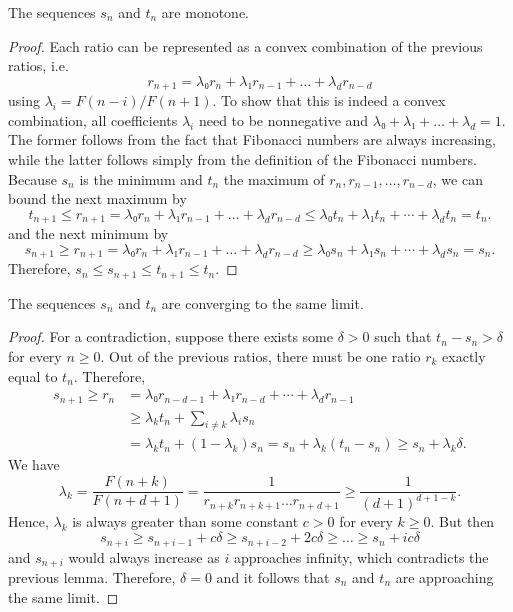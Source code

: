 \begin{lemma}
  The sequences $s_n$ and $t_n$ are monotone.
\end{lemma}

\begin{proof}
  Each ratio can be represented as a convex combination of the previous ratios, i.e.
  \[
    r_{n+1} = λ₀ r_n + λ₁ r_{n-1} + \dots + λ_d r_{n-d}
  \]
  using $λ_i = F(n - i) / F(n + 1)$.
  To show that this is indeed a convex combination, all coefficients $λ_i$
  need to be nonnegative and $λ₀ + λ₁ + \dots + \lambda_d = 1$.
  The former follows from the fact that Fibonacci numbers are always increasing,
  while the latter follows simply from the definition of the Fibonacci numbers.
  Because $s_n$ is the minimum and $t_n$ the maximum of $r_n, r_{n-1}, …, r_{n-d}$,
  we can bound the next maximum by
  \[
    t_{n+1} ≤ r_{n+1} = λ₀ r_n + λ₁ r_{n-1} + \dots + λ_d r_{n-d} ≤ λ₀ t_n + λ₁ t_n + ⋯ + λ_d t_n = t_n.
  \]
  and the next minimum by
  \[
    s_{n+1} ≥ r_{n+1} = λ₀ r_n + λ₁ r_{n-1} + \dots + λ_d r_{n-d} ≥ λ₀ s_n + λ₁ s_n + ⋯ + λ_d s_n = s_n.
  \]
  Therefore, $s_n ≤ s_{n+1} ≤ t_{n+1} ≤ t_n$.
\end{proof}

\begin{lemma}
  The sequences $s_n$ and $t_n$ are converging to the same limit.
\end{lemma}

\begin{proof}
  For a contradiction, suppose there exists some $δ > 0$ such that $t_n - s_n > δ$ for every $n ≥ 0$.
  Out of the previous ratios, there must be one ratio $r_k$ exactly equal to $t_n$.
  Therefore,
  \begin{align*}
    s_{n+1} ≥ r_n & = λ₀ r_{n-d-1} + λ₁ r_{n-d} + ⋯ + λ_d r_{n-1} \\
                  & ≥ λ_k t_n + \sum_{i ≠ k} λ_i s_n \\
                  & = λ_k t_n + (1 - λ_k) s_n = s_n + λ_k (t_n - s_n) ≥ s_n + λ_k δ.
  \end{align*}
  We have
  \[
    λ_k = \frac{F(n+k)}{F(n+d+1)} = \frac{1}{r_{n+k} r_{n+k+1} \dots r_{n+d+1}} ≥ \frac{1}{(d+1)^{d+1-k}}.
  \]
  Hence, $λ_k$ is always greater than some constant $c > 0$ for every $k ≥ 0$.
  But then
  \[
    s_{n+i} ≥ s_{n+i-1} + c δ ≥ s_{n+i-2} + 2c δ ≥ \dots ≥ s_n + i c δ
  \]
  and $s_{n+i}$ would always increase as $i$ approaches infinity,
  which contradicts the previous lemma.
  Therefore, $δ = 0$ and it follows that $s_n$ and $t_n$ are approaching the same limit.
\end{proof}

